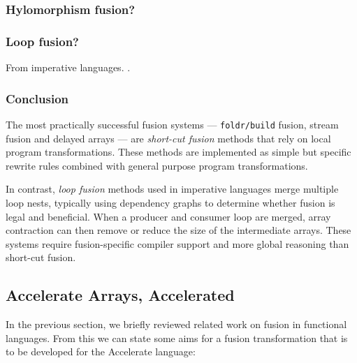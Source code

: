 \subsubsection{Hylomorphism fusion?}
\citet{Takano:1995}

\subsubsection{Loop fusion?}
From imperative languages. \citet{Warren:1984ka}. \citet{Sarkar:1991ff}


\subsubsection{Conclusion}

The most practically successful fusion systems ---
\texttt{foldr/build} fusion,
stream fusion and delayed arrays --- are \emph{short-cut fusion} methods that
rely on local program transformations. These methods are implemented as simple
but specific rewrite rules combined with general purpose program
transformations.

In contrast, \emph{loop fusion} methods used in imperative
languages merge multiple loop nests, typically using dependency
graphs to determine whether fusion is legal and beneficial.
When a producer and consumer loop are merged, array
contraction can then remove or reduce the size of the
intermediate arrays. These systems require fusion-specific compiler support and
more global reasoning than short-cut fusion.


\subsection{Accelerate Arrays, Accelerated}

In the previous section, we briefly reviewed related work on fusion in
functional languages. From this we can state some aims for a fusion
transformation that is to be developed for the Accelerate language:

